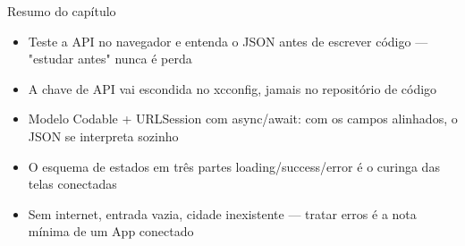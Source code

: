 \begin{tcbsummary}{Resumo do capítulo}
\begin{itemize}
  \item Teste a API no navegador e entenda o JSON antes de escrever código — "estudar antes" nunca é perda
  \item A chave de API vai escondida no xcconfig, jamais no repositório de código
  \item Modelo Codable + URLSession com async/await: com os campos alinhados, o JSON se interpreta sozinho
  \item O esquema de estados em três partes loading/success/error é o curinga das telas conectadas
  \item Sem internet, entrada vazia, cidade inexistente — tratar erros é a nota mínima de um App conectado
\end{itemize}

\end{tcbsummary}
